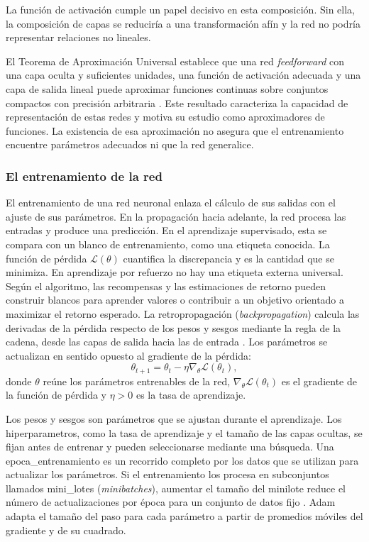 La función de activación cumple un papel decisivo en esta composición. Sin ella, la composición de capas se reduciría a una transformación afín y la red no podría representar relaciones no lineales.

El Teorema de Aproximación Universal establece que una red \textit{feedforward} con una capa oculta y suficientes unidades, una función de activación adecuada y una capa de salida lineal puede aproximar funciones continuas sobre conjuntos compactos con precisión arbitraria \cite{goodfellow2016deep}. Este resultado caracteriza la capacidad de representación de estas redes y motiva su estudio como aproximadores de funciones. La existencia de esa aproximación no asegura que el entrenamiento encuentre parámetros adecuados ni que la red generalice.

\subsubsection{El entrenamiento de la red}

El entrenamiento de una red neuronal enlaza el cálculo de sus salidas con el ajuste de sus parámetros. En la propagación hacia adelante, la red procesa las entradas y produce una predicción. En el aprendizaje supervisado, esta se compara con un blanco de entrenamiento, como una etiqueta conocida. La función de pérdida $\mathcal{L}(\theta)$ cuantifica la discrepancia y es la cantidad que se minimiza. En aprendizaje por refuerzo no hay una etiqueta externa universal. Según el algoritmo, las recompensas y las estimaciones de retorno pueden construir blancos para aprender valores o contribuir a un objetivo orientado a maximizar el retorno esperado. La retropropagación (\textit{backpropagation}) calcula las derivadas de la pérdida respecto de los pesos y sesgos mediante la regla de la cadena, desde las capas de salida hacia las de entrada \cite{bishop2024deep}.
Los parámetros se actualizan en sentido opuesto al gradiente de la pérdida:
\begin{equation}
    \theta_{t+1}=\theta_t-\eta\nabla_{\theta}\mathcal{L}(\theta_t),
    \label{eq:descenso_gradiente}
\end{equation}
donde $\theta$ reúne los parámetros entrenables de la red, $\nabla_{\theta}\mathcal{L}(\theta_t)$ es el gradiente de la función de pérdida y $\eta>0$ es la tasa de aprendizaje.

Los pesos y sesgos son parámetros que se ajustan durante el aprendizaje. Los \glspl{hiperparametro}, como la tasa de aprendizaje y el tamaño de las capas ocultas, se fijan antes de entrenar y pueden seleccionarse mediante una búsqueda. Una \gls{epoca_entrenamiento} es un recorrido completo por los datos que se utilizan para actualizar los parámetros. Si el entrenamiento los procesa en subconjuntos llamados \glspl{mini_lote} (\textit{minibatches}), aumentar el tamaño del minilote reduce el número de actualizaciones por época para un conjunto de datos fijo \cite{bishop2024deep}. Adam adapta el tamaño del paso para cada parámetro a partir de promedios móviles del gradiente y de su cuadrado.


